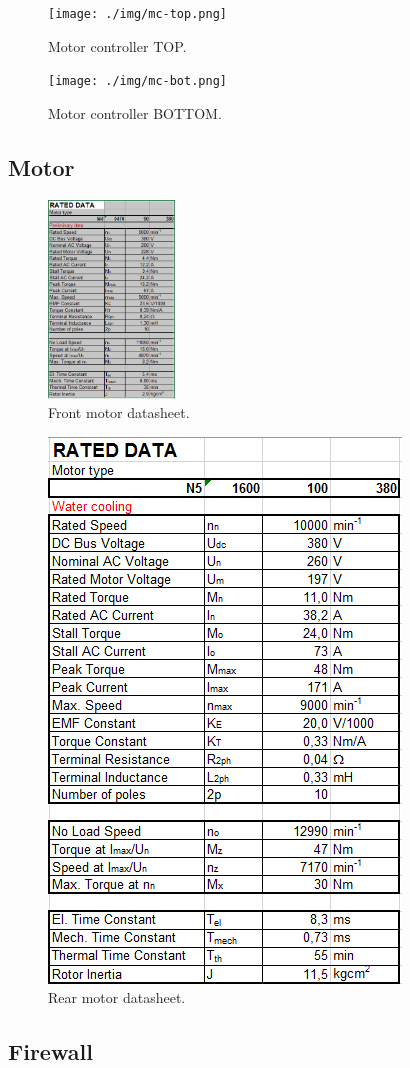 \begin{figure}[H]
	\centering
	\texttt{[image: ./img/mc-top.png]}
	\caption{Motor controller TOP.}
	\label{app:mc-top}
\end{figure}

\begin{figure}[H]
	\centering
	\texttt{[image: ./img/mc-bot.png]}
	\caption{Motor controller BOTTOM.}
	\label{app:mc-bot}
\end{figure}

\subsection{Motor}

\begin{figure}[H]
	\centering
	\includegraphics[width=0.3\textwidth]{./img/app-mf.png}
	\caption{Front motor datasheet.}
	\label{app:mf}
\end{figure}

\begin{figure}[H]
	\centering
	\includegraphics[width=.3\textwidth]{./img/app-mr.png}
	\caption{Rear motor datasheet.}
	\label{app:mr}
\end{figure}

\subsection{Firewall}

